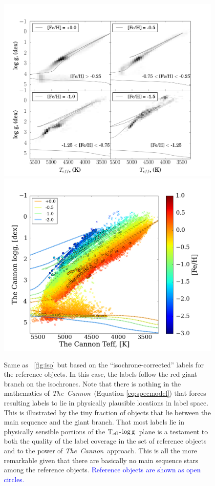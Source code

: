 \documentclass[12pt, preprint]{aastex}
\newcommand{\tc}{\textsl{The~Cannon}}
\newcommand{\teff}{\mbox{$\rm T_{eff}$}}
\newcommand{\logg}{\mbox{$\rm \log g$}}
\begin{document}
\begin{figure}[!h]
\centering
 \includegraphics[scale=0.26]{./plots/aftersubmit/fig9a2.png}
  \hspace{-20pt}
    \includegraphics[scale=0.26]{./plots/aftersubmit/fig9b2.png}
\caption{Same as \figurename~\ref{fig:iso} but based on the ``isochrone-corrected'' labels for the reference objects. In this case, the labels follow the red giant branch on the isochrones. Note that there is nothing in the mathematics of \tc\ (Equation \ref{eq:specmodel}) that forces resulting labels to lie in physically plausible locations in label space. This is illustrated by the tiny fraction of objects that lie between the main sequence and the giant branch. That most labels lie in physically sensible portions of the \teff-\logg\ plane is a testament to both the quality of the label coverage in the set of reference objects and to the power of \tc\ approach. This is all the more remarkable given that there are basically no main sequence stars among the reference objects. \textcolor{blue}{ Reference objects are shown as open circles.}}
\label{fig:iso2}
\end{figure}
\end{document}

